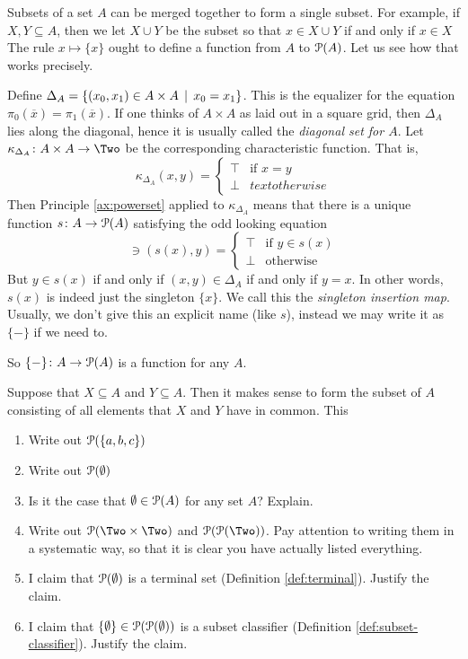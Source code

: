 Subsets of a set $A$ can be merged together to form a single subset. 
For example, if $X,Y\subseteq A$, then we let $X\cup Y$ be the subset
so that $x\in X\cup Y$ if and only if $x\in X$ 
The rule $x\mapsto \{x\}$ ought to define a function from $A$ to ${\mathcal{P}}(A)$. Let us see how that works precisely.

Define $\Delta_A = \{(x_0,x_1)\in A\times A\,\mid\, x_0=x_1\}$. This is the equalizer for the equation $\pi_0(\overline x)=\pi_1(\overline x)$.
If one thinks of $A\times A$ as laid out in a square grid, then $\Delta_A$ lies along the diagonal, hence it is usually called the \emph{diagonal set for $A$}.
Let $\fromto {\kappa_{\Delta_A}}{A\times A}\Two$ be the corresponding characteristic function. That is,
\[
\kappa_{\Delta_A}(x,y) = \begin{cases}
\top & \text{if $x=y$}\\
\bot & text{otherwise}
\end{cases}
\]
Then Principle \ref{ax:powerset} applied to $\kappa_{\Delta_A}$ means that there is a unique function ${s}\colon{A}\to{{\mathcal{P}}(A)}$ satisfying the odd looking equation 
\[
\ni(s(x),y) = \begin{cases}
		\top & \text{if $y\in s(x)$}\\
		\bot &\text{otherwise}
	\end{cases}
\]
But $y\in s(x)$ if and only if $(x,y)\in\Delta_A$ if and only if $y=x$. 
In other words, $s(x)$ is indeed just the singleton $\{x\}$. We call this the \emph{singleton insertion map}. Usually, we don't give this an explicit name (like $s$), instead we may write it as $\{-\}$ if we need to.

So ${\{-\}}\colon{A}\to{{\mathcal{P}}(A)}$ is a function for any $A$. 

Suppose that $X\subseteq A$ and $Y\subseteq A$. Then it makes sense to form the subset of $A$ consisting of all elements that $X$ and $Y$ have in common. This 

\begin{exercises}
	\begin{enumerate}
		\item Write out ${\mathcal{P}}(\{a,b,c\})$
		\item Write out ${\mathcal{P}}(\emptyset)$
		\item Is it the case that $\emptyset \in {\mathcal{P}}(A)$ for any set $A$? Explain. 
		\item Write out $\powerset(\Two\times \Two)$ and $\powerset(\powerset(\Two))$. Pay attention to writing them in a systematic way, so that it is clear you have actually listed everything.
		\item I claim that ${\mathcal{P}}(\emptyset)$ is a terminal set (Definition \ref{def:terminal}). Justify the claim.
		\item I claim that $\{\emptyset\}\in {\mathcal{P}}({\mathcal{P}}(\emptyset))$ is a subset classifier (Definition \ref{def:subset-classifier}). Justify the claim.
	\end{enumerate}
\end{exercises}

